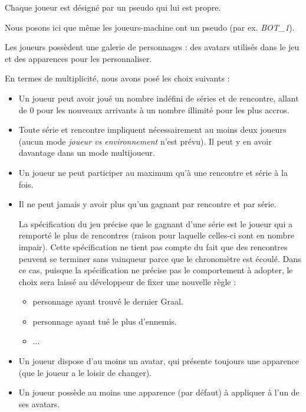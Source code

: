 \documentclass[oneside,a4paper]{book}
\begin{document}
Chaque joueur est désigné par un pseudo qui lui est propre.
\begin{tcolorbox}
    Nous posons ici que même les joueurs-machine ont un pseudo (par ex. \textit{BOT\_1}).
\end{tcolorbox}

Les joueurs possèdent une galerie de personnages : des avatars utilisés dans le jeu et des apparences pour les personnaliser. \newline

En termes de multiplicité, nous avons posé les choix suivants :
\begin{itemize}
    \item Un joueur peut avoir joué un nombre indéfini de séries et de rencontre, allant de 0 pour les nouveaux arrivants à un nombre illimité pour les plus accros.
    \item Toute série et rencontre impliquent nécessairement au moins deux joueurs (aucun mode \textit{joueur vs environnement} n'est prévu). Il peut y en avoir davantage dans un mode multijoueur.
    \item Un joueur ne peut participer au maximum qu'à une rencontre et série à la fois.
    \item Il ne peut jamais y avoir plus qu'un gagnant par rencontre et par série.
        \begin{tcolorbox}
        La spécification du jeu précise que le gagnant d'une série est le joueur qui a remporté le plus de rencontres (raison pour laquelle celles-ci sont en nombre impair). Cette spécification ne tient pas compte du fait que des rencontres peuvent se terminer sans vainqueur parce que le chronomètre est écoulé. 
        Dans ce cas, puisque la spécification ne précise pas le comportement à adopter, le choix sera laissé au développeur de fixer une nouvelle règle : 
            \begin{itemize}
                \item personnage ayant trouvé le dernier Graal.
                \item personnage ayant tué le plus d'ennemis.
                \item ...
            \end{itemize}
        \end{tcolorbox}
    \item Un joueur dispose d'au moins un avatar, qui présente toujours une apparence (que le joueur a le loisir de changer).
    \item Un joueur possède au moins une apparence (par défaut) à appliquer à l'un de ses avatars.
\end{itemize}
\end{document}
